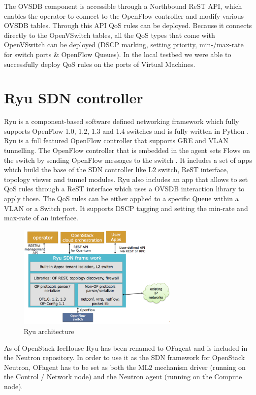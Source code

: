 The OVSDB component is accessible through a Northbound ReST API, which enables the operator to connect to the OpenFlow controller and modify various OVSDB tables. Through this API QoS rules can be deployed. Because it connects directly to the OpenVSwitch tables, all the QoS types that come with OpenVSwitch can be deployed (DSCP marking, setting priority, min-/max-rate for switch ports \& OpenFlow Queues). In the local testbed we were able to successfully deploy QoS rules on the ports of Virtual Machines. 


\section{Ryu SDN controller}

Ryu is a component-based software defined networking framework which fully supports OpenFlow 1.0, 1.2, 1.3 and 1.4 switches and is fully written in Python \cite{ryu-start}. Ryu is a full featured OpenFlow controller that supports GRE and VLAN tunnelling. The OpenFlow controller that is embedded in the agent sets Flows on the switch by sending OpenFlow messages to the switch \cite{ryu-comparison}. It includes a set of apps which build the base of the SDN controller like L2 switch, ReST interface, topology viewer and tunnel modules. Ryu also includes an app that allows to set QoS rules through a ReST interface which uses a OVSDB interaction library to apply those. The QoS rules can be either applied to a specific Queue within a VLAN or a Switch port. It supports DSCP tagging and setting the min-rate and max-rate of an interface.

\begin{figure}[H]
\centering
\includegraphics[width=0.7\textwidth]{images/sota/ryu_architecture.png}
\caption{Ryu architecture}
\end{figure}


As of OpenStack IceHouse Ryu has been renamed to OFagent and is included in the Neutron repository. In order to use it as the SDN framework for OpenStack Neutron, OFagent has to be set as both the ML2 mechanism driver (running on the Control / Network node) and the Neutron agent (running on the Compute node). 


